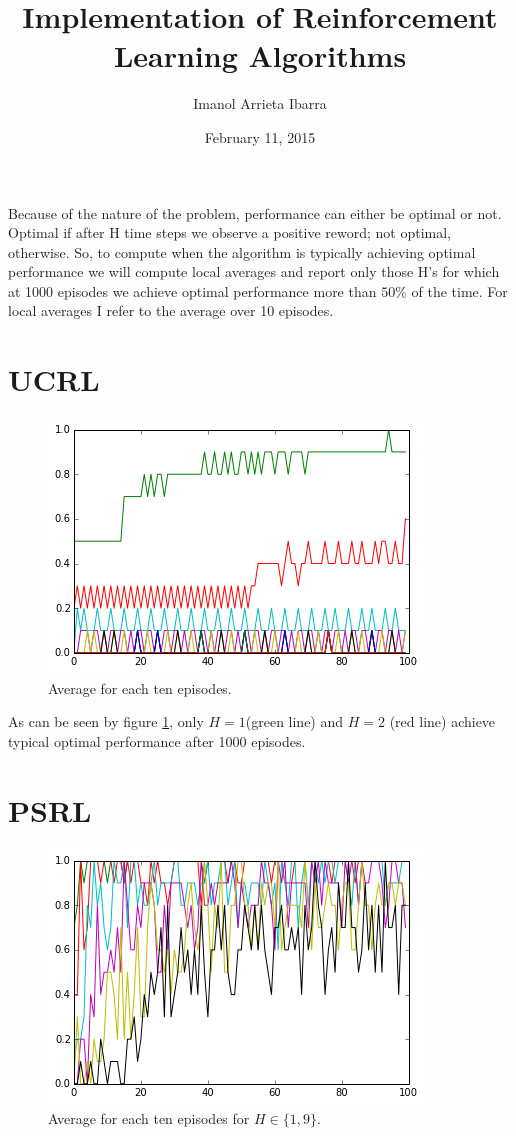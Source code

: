 \documentclass[12pt]{article}
\begin{document}
\title{Implementation of Reinforcement Learning Algorithms}
\date{February 11, 2015}
\author{Imanol Arrieta Ibarra}
\maketitle

Because of the nature of the problem, performance can either be optimal or not. Optimal if after H time steps we observe a positive reword; not optimal, otherwise. So, to compute when the algorithm is typically achieving optimal performance we will compute local averages and report only those H's for which at 1000 episodes we achieve optimal performance more than $50\%$ of the time. For local averages I refer to the average over 10 episodes. 

\section{UCRL}
\begin{figure}[h]
\centering
\includegraphics[scale=.4]{Average_Last_Ten.png}
\caption{Average for each ten episodes.}
\label{fig:UCRL}
\end{figure}

As can be seen by figure \ref{fig:UCRL}, only $H=1$(green line) and $H=2$ (red line) achieve typical optimal performance after 1000 episodes. 
\pagebreak
\section{PSRL}
\begin{figure}[h]
\centering
\includegraphics[scale=.4]{Average_Last_Ten_PSRL.png}
\caption{Average for each ten episodes for $H\in\{1,9\}$.}
\label{fig:PSRL}
\end{figure}
\end{document}
